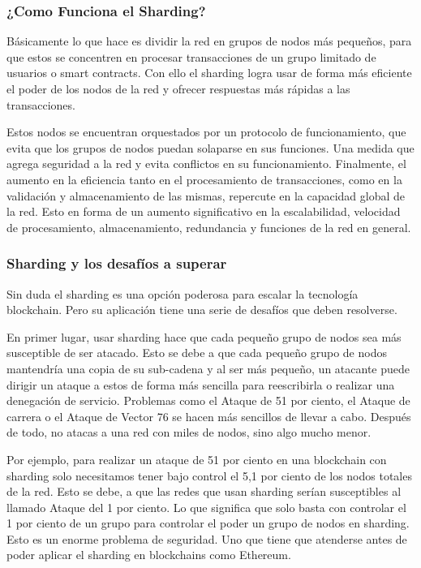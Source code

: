 \documentclass[twoside,twocolumn]{article}
\begin{document}
\subsubsection{¿Como Funciona el Sharding?}
Básicamente lo que hace es dividir la red
 en grupos de nodos más pequeños, para que 
 estos se concentren en procesar transacciones 
 de un grupo limitado de usuarios o smart contracts.
  Con ello el sharding logra usar de forma más eficiente
   el poder de los nodos de la red y ofrecer respuestas más
    rápidas a las transacciones.

Estos nodos se encuentran orquestados por un 
protocolo de funcionamiento, que evita que los grupos de 
nodos puedan solaparse en sus funciones. Una medida que agrega seguridad 
a la red y evita conflictos en su funcionamiento.  Finalmente, el aumento en 
la eficiencia tanto en el procesamiento de transacciones, como en la validación
 y almacenamiento de las mismas, repercute en la capacidad global de la red.
  Esto en forma de un aumento significativo en la escalabilidad, velocidad de 
  procesamiento, almacenamiento, 
redundancia y funciones de la red en general.


   
\subsubsection{Sharding y los desafíos a superar}

Sin duda el sharding es una opción poderosa para escalar 
la tecnología blockchain. Pero su aplicación tiene una serie 
de desafíos que deben resolverse.

En primer lugar, usar sharding hace que cada pequeño grupo de
 nodos sea más susceptible de ser atacado. Esto se debe a que
  cada pequeño grupo de nodos mantendría una copia de su sub-cadena
   y al ser más pequeño, un atacante puede dirigir un ataque a estos
    de forma más sencilla para reescribirla o realizar una denegación 
    de servicio. Problemas como el Ataque de 51 por ciento,
 el Ataque de carrera o el Ataque de Vector 76 se hacen más 
 sencillos de llevar a cabo. Después de todo, no atacas a una red
  con miles de nodos, sino algo mucho menor.

Por ejemplo, para realizar un ataque de 51 por ciento
 en una blockchain con sharding solo necesitamos tener bajo 
 control el 5,1 por ciento
  de los nodos totales de la red. Esto se debe,
   a que las redes que usan sharding serían susceptibles 
   al llamado Ataque del 1 por ciento. Lo que significa que solo
    basta con controlar el 1 por ciento
     de un grupo para controlar el poder un grupo de nodos en sharding.
      Esto es un enorme problema de seguridad. Uno que tiene que atenderse
       antes de poder aplicar el sharding en blockchains como Ethereum.
\end{document}
